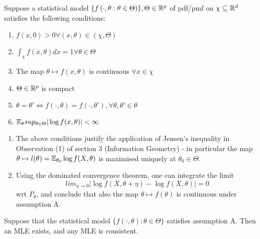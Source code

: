 \documentclass[a4paper]{article}
\begin{document}
\begin{assumption}
	Suppose a statistical model $\{f\left( \cdot , \theta : \theta \in \Theta \right) \}, \Theta \in \mathbb{R}^{p}$ of pdf/pmf on $\chi \subseteq \mathbb{R}^{d}$ satisfies the following conditions:

\begin{enumerate}
	\item $f(x,0) > 0 \forall (x, \theta) \in  (\chi, \Theta)$
	\item $\int_{\chi} f(x,\theta) dx = 1 \forall \theta \in \Theta$
	\item The map $\theta \mapsto f(x, \theta)$ is continuous $\forall x \in  \chi$
	\item  $\Theta \in \mathbb{R}^{p}$ is compact
	\item $\theta = \theta' \iff f(\cdot , \theta) = f(\cdot , \theta'), \forall \theta, \theta' \in \theta $
	\item $\mathbb{E}_{\theta} sup_{\theta \in \Theta} |\log f(x, \theta)| < \infty$
\end{enumerate}

\end{assumption}

\begin{remark}
	\begin{enumerate}
		\item The above conditions justify the application of Jensen's inequality in Observation (1) of section 3 (Information Geometry) - in particular the map $ \theta \mapsto l(\theta) = \mathbb{E}_{\theta_0} \log f(X, \theta)$ is maximised uniquely at $\theta_0 \in \Theta$.
		\item Using the dominated convergence theorem, one can integrate the limit
			\[
				lim_{\eta \to  0} |\log f(X, \theta + \eta) - \log f(X, \theta)| = 0
			\] wrt $P_\theta$, and conclude that also the map $\theta \mapsto f(\theta)$ is continuous under assumption A.
	\end{enumerate}
\end{remark}

\begin{thm}
	Suppose that the statistical model $\{f\left( \cdot , \theta \right) : \theta \in \Theta \}$ satisfies assumption A. Then an MLE exists, and any MLE is consistent.
\end{thm}
\end{document}
